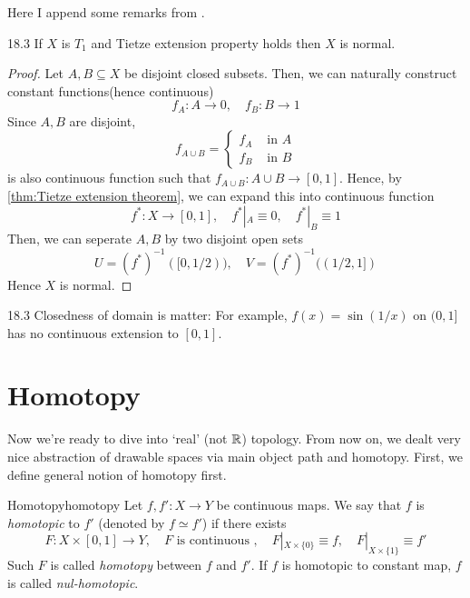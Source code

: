 \documentclass[12pt, a4paper, twoside]{article}
\theoremstyle{plain}
\begin{document}
\newpage

Here I append some remarks from \cite{Lecture01}. 

\begin{cor}{}{18.3}
    If $X$ is $T_1$ and Tietze extension property holds then $X$ is normal. 
\end{cor}

\begin{proof}
    Let $A, B \subseteq X$ be disjoint closed subsets. 
    Then, we can naturally construct constant functions(hence continuous)
    \[f_A : A \rightarrow 0, \quad f_B : B \rightarrow 1\]
    Since $A, B$ are disjoint, 
    \[f_{A \cup B} = \begin{cases}
        f_A & \text{ in $A$} \\
        f_B & \text{ in $B$}
    \end{cases}\]
    is also continuous function such that $f_{A \cup B} : A \cup B \rightarrow [0,1]$. 
    Hence, by \ref{thm:Tietze extension theorem}, we can expand this into continuous function
    \[f^* : X \rightarrow [0,1], \quad f^*|_A \equiv 0 , \quad f^*|_B \equiv 1\]
    Then, we can seperate $A, B$ by two disjoint open sets 
    \[U = (f^*)^{-1}([0, 1/2)), \quad V = (f^*)^{-1}((1/2, 1])\]
    Hence $X$ is normal. 
\end{proof}

\begin{rem}{}{18.3}
    Closedness of domain is matter: For example, $f(x) = \sin(1/x)$ on $(0, 1]$ has no 
    continuous extension to $[0, 1]$. 
\end{rem}

\newpage 

\section{Homotopy}

Now we're ready to dive into \lq real' (not ${\mathbb {R}}$) topology. From now on, 
we dealt very nice abstraction of drawable spaces via main object path and homotopy. 
First, we define general notion of homotopy first. 

\begin{defn}{Homotopy}{homotopy}
    Let $f, f': X \rightarrow Y$ be continuous maps. 
    We say that $f$ is \textit{homotopic} to $f'$ (denoted by $f \simeq f'$) if there exists 
    \[F: X \times [0,1] \rightarrow Y, \quad F\text{ is continuous }, \quad F|_{X \times \{0\}} \equiv f, \quad F|_{X \times \{1\}} \equiv f'\]
    Such $F$ is called \textit{homotopy} between $f$ and $f'$. 
    If $f$ is homotopic to constant map, $f$ is called \textit{nul-homotopic}. 
\end{defn}
\end{document}
